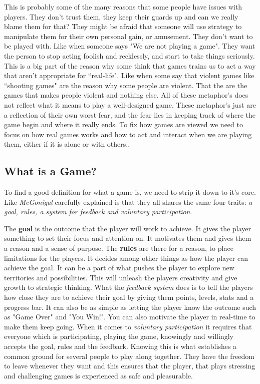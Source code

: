This is probably some of the many reasons that some people have issues with players. They don't trust them, they keep their guards up and can we really blame them for that? They might be afraid that someone will use strategy to manipulate them for their own personal gain, or amusement. They don't want to be played with. Like when someone says "We are not playing a game". They want the person to stop acting foolish and recklessly, and start to take things seriously. This is a big part of the reason why some think that games trains us to act a way that aren't appropriate for ``real-life". Like when some say that violent games like ``shooting games" are the reason why some people are violent. That the are the games that makes people violent and nothing else. All of these metaphor's does not reflect what it means to play a well-designed game. These metaphor's just are a reflection of their own worst fear, and the fear lies in keeping track of where the game begin and where it really ends. To fix how games are viewed we need to focus on how real games works and how to act and interact when we are playing them, either if it is alone or with others.\cite[P.~19-20]{RealityIsBroken}. 

\subsection{What is a Game?}
\label{sec:WhatAGameIs}  
To find a good definition for what a game is, we need to strip it down to it's core. Like \textit{McGonigal} carefully explained is that they all shares the same four traits: \textit{a goal, rules, a system for feedback and voluntary participation}.

The \textbf{goal} is the outcome that the player will work to achieve. It gives the player something to set their focus and attention on. It motivates them and gives them a reason and a sense of purpose. The \textbf{rules} are there for a reason, to place limitations for the players. It decides among other things as how the player can achieve the goal. It can be a part of what pushes the player to explore new territories and possibilities. This will unleash the players creativity and give growth to strategic thinking. What the \textit{feedback system} does is to tell the players how close they are to achieve their goal by giving them points, levels, stats and a progress bar. It can also be as simple as letting the player know the outcome such as "Game Over" and "You Win!". You can also motivate the player in real-time to make them keep going. When it comes to \textit{voluntary participation} it requires that everyone which is participating, playing the game, knowingly and willingly accepts the goal, rules and the feedback. Knowing this is what establishes a common ground for several people to play along together. They have the freedom to leave whenever they want and this ensures that the player, that plays stressing and challenging games is experienced as safe and pleasurable.\cite[P.~20-22]{RealityIsBroken}

